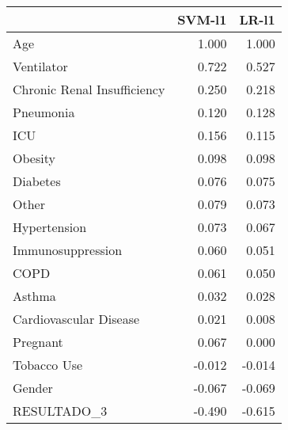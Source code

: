 \begin{tabular}{lrr}
\toprule
{} &  SVM-l1 &  LR-l1 \\
\midrule
Age                         &   1.000 &  1.000 \\
Ventilator                  &   0.722 &  0.527 \\
Chronic Renal Insufficiency &   0.250 &  0.218 \\
Pneumonia                   &   0.120 &  0.128 \\
ICU                         &   0.156 &  0.115 \\
Obesity                     &   0.098 &  0.098 \\
Diabetes                    &   0.076 &  0.075 \\
Other                       &   0.079 &  0.073 \\
Hypertension                &   0.073 &  0.067 \\
Immunosuppression           &   0.060 &  0.051 \\
COPD                        &   0.061 &  0.050 \\
Asthma                      &   0.032 &  0.028 \\
Cardiovascular Disease      &   0.021 &  0.008 \\
Pregnant                    &   0.067 &  0.000 \\
Tobacco Use                 &  -0.012 & -0.014 \\
Gender                      &  -0.067 & -0.069 \\
RESULTADO\_3                 &  -0.490 & -0.615 \\
\bottomrule
\end{tabular}
